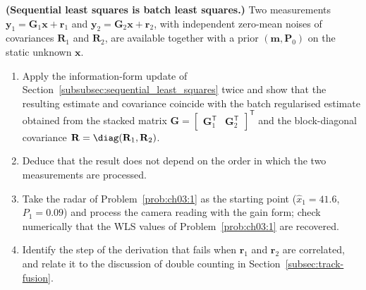 \begin{prob}\label{prob:ch03:3}
\textbf{(Sequential least squares is batch least squares.)} Two measurements $\mathbf{y}_1=\mathbf{G}_1\mathbf{x}+\mathbf{r}_1$ and $\mathbf{y}_2=\mathbf{G}_2\mathbf{x}+\mathbf{r}_2$, with independent zero-mean noises of covariances $\mathbf{R}_1$ and $\mathbf{R}_2$, are available together with a prior $(\mathbf{m},\mathbf{P}_0)$ on the static unknown $\mathbf{x}$.
\begin{enumerate}
\item[(a)] Apply the information-form update of Section~\ref{subsubsec:sequential_least_squares} twice and show that the resulting estimate and covariance coincide with the batch regularised estimate obtained from the stacked matrix $\mathbf{G}=\begin{bmatrix}\mathbf{G}_1^{\mathsf T}&\mathbf{G}_2^{\mathsf T}\end{bmatrix}^{\mathsf T}$ and the block-diagonal covariance $\mathbf{R}=\diag(\mathbf{R}_1,\mathbf{R}_2)$.
\item[(b)] Deduce that the result does not depend on the order in which the two measurements are processed.
\item[(c)] Take the radar of Problem~\ref{prob:ch03:1} as the starting point ($\widehat{x}_1=41.6$, $P_1=0.09$) and process the camera reading with the gain form; check numerically that the WLS values of Problem~\ref{prob:ch03:1} are recovered.
\item[(d)] Identify the step of the derivation that fails when $\mathbf{r}_1$ and $\mathbf{r}_2$ are correlated, and relate it to the discussion of double counting in Section~\ref{subsec:track-fusion}.
\end{enumerate}
\end{prob}

